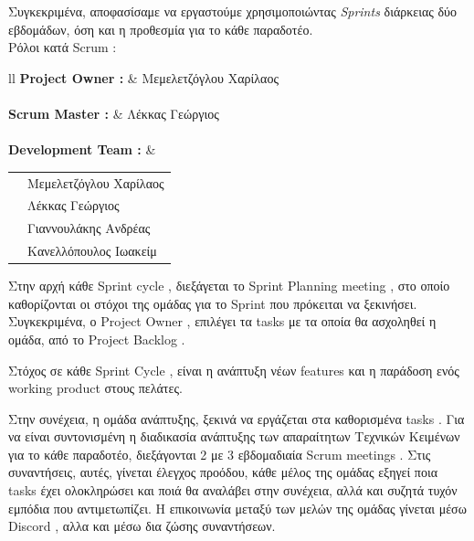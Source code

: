 \documentclass{../ol-softwaremanual}
\begin{document}
	Συγκεκριμένα, αποφασίσαμε να εργαστούμε χρησιμοποιώντας \en \textit{Sprints} \gr διάρκειας δύο εβδομάδων, όση και η προθεσμία για το κάθε παραδοτέο. \\ 
	
	Ρόλοι κατά \en Scrum \gr : \newline
	
	
	\flushleft
	\begin{tabular}{ll}
		\en \textbf{Project Owner : }  & \gr \hspace{5mm}  Μεμελετζόγλου Χαρίλαος \\
		\\ \en \textbf{Scrum Master : } &  \gr \hspace{5mm} Λέκκας Γεώργιος \\
		
		\\ \en \textbf{Development Team : } & \begin{tabular}[t]{ll}
			&  \gr  Μεμελετζόγλου Χαρίλαος  \\
			& \gr     Λέκκας Γεώργιος \\
			& \gr     Γιαννουλάκης Ανδρέας \\
			& \gr     Κανελλόπουλος Ιωακείμ \\
		\end{tabular} 
	\end{tabular} \linebreak
	
	\vspace{20pt}
	
	Στην αρχή κάθε \en Sprint cycle \gr , διεξάγεται το \en Sprint Planning meeting \gr , στο οποίο καθορίζονται οι στόχοι της ομάδας για το \en Sprint \gr που πρόκειται να ξεκινήσει. Συγκεκριμένα, ο \en Project Owner \gr , επιλέγει τα \en tasks \gr με τα οποία θα ασχοληθεί η ομάδα, από το \en Project Backlog \gr . \\
	
	\vspace{5pt}
	
	Στόχος σε κάθε \en Sprint Cycle \gr , είναι η ανάπτυξη νέων \en features \gr και η παράδοση ενός \en working product \gr στους πελάτες. \\ 
	
	\vspace{5pt}
	
	Στην συνέχεια, η ομάδα ανάπτυξης, ξεκινά να εργάζεται στα καθορισμένα \en tasks \gr .
	Για να είναι συντονισμένη η διαδικασία ανάπτυξης των απαραίτητων Τεχνικών Κειμένων για το κάθε παραδοτέο, διεξάγονται 2 με 3 εβδομαδιαία \en Scrum meetings \gr . Στις συναντήσεις, αυτές, γίνεται έλεγχος προόδου, κάθε μέλος της ομάδας εξηγεί ποια \en tasks \gr έχει ολοκληρώσει και ποιά θα αναλάβει στην συνέχεια, αλλά και συζητά τυχόν εμπόδια που αντιμετωπίζει.
	Η επικοινωνία μεταξύ των μελών της ομάδας γίνεται μέσω \en Discord \gr, αλλα και μέσω δια ζώσης συναντήσεων. \\
	
\end{document}

